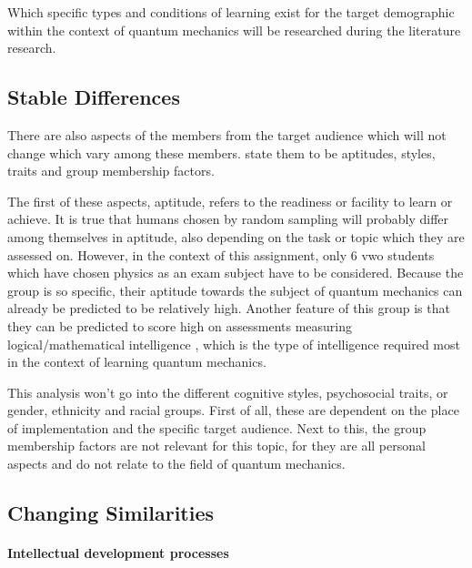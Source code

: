 \documentclass[11pt,twoside]{report} %
\begin{document}
Which specific types and conditions of learning exist for the target demographic within the context of quantum mechanics will be researched during the literature research.


\subsection{Stable Differences}

There are also aspects of the members from the target audience which will not change which vary among these members.  state them to be aptitudes, styles, traits and group membership factors.

The first of these aspects, aptitude, refers to the readiness or facility to learn or achieve. It is true that humans chosen by random sampling will probably differ among themselves in aptitude, also depending on the task or topic which they are assessed on. However, in the context of this assignment, only 6 vwo students which have chosen physics as an exam subject have to be considered. Because the group is so specific, their aptitude towards the subject of quantum mechanics can already be predicted to be relatively high. Another feature of this group is that they can be predicted to score high on assessments measuring logical/mathematical intelligence \cite{intelligences}, which is the type of intelligence required most in the context of learning quantum mechanics.

This analysis won't go into the different cognitive styles, psychosocial traits, or gender, ethnicity and racial groups. First of all, these are dependent on the place of implementation and the specific target audience. Next to this, the group membership factors are not relevant for this topic, for they are all personal aspects and do not relate to the field of quantum mechanics.


\subsection{Changing Similarities}

\label{subsec:misconceptions}

\paragraph{Intellectual development processes}
\end{document}
